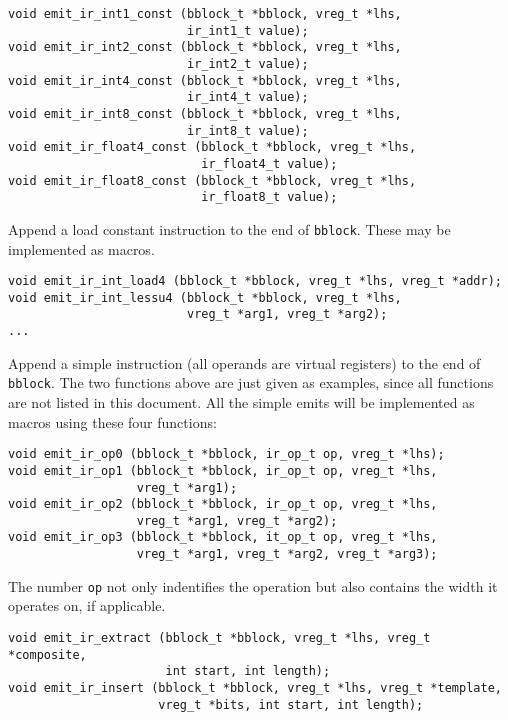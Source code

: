 \documentclass{article}
\newcommand{\cc}[1]{\texttt{#1}} %
\begin{document}
\begin{verbatim}
void emit_ir_int1_const (bblock_t *bblock, vreg_t *lhs,
                         ir_int1_t value);
void emit_ir_int2_const (bblock_t *bblock, vreg_t *lhs,
                         ir_int2_t value);
void emit_ir_int4_const (bblock_t *bblock, vreg_t *lhs,
                         ir_int4_t value);
void emit_ir_int8_const (bblock_t *bblock, vreg_t *lhs,
                         ir_int8_t value);
void emit_ir_float4_const (bblock_t *bblock, vreg_t *lhs,
                           ir_float4_t value);
void emit_ir_float8_const (bblock_t *bblock, vreg_t *lhs,
                           ir_float8_t value);
\end{verbatim}

Append a load constant instruction to the end of \cc{bblock}.  These
may be implemented as macros.

\begin{verbatim}
void emit_ir_int_load4 (bblock_t *bblock, vreg_t *lhs, vreg_t *addr);
void emit_ir_int_lessu4 (bblock_t *bblock, vreg_t *lhs,
                         vreg_t *arg1, vreg_t *arg2);
...
\end{verbatim}

Append a simple instruction (all operands are virtual registers) to
the end of \cc{bblock}.  The two functions above are just given as
examples, since all functions are not listed in this document.  All
the simple emits will be implemented as macros using these four
functions:

\begin{verbatim}
void emit_ir_op0 (bblock_t *bblock, ir_op_t op, vreg_t *lhs);
void emit_ir_op1 (bblock_t *bblock, ir_op_t op, vreg_t *lhs,
                  vreg_t *arg1);
void emit_ir_op2 (bblock_t *bblock, ir_op_t op, vreg_t *lhs,
                  vreg_t *arg1, vreg_t *arg2);
void emit_ir_op3 (bblock_t *bblock, it_op_t op, vreg_t *lhs,
                  vreg_t *arg1, vreg_t *arg2, vreg_t *arg3);
\end{verbatim}

The number \cc{op} not only indentifies the operation but also
contains the width it operates on, if applicable.

\begin{verbatim}
void emit_ir_extract (bblock_t *bblock, vreg_t *lhs, vreg_t *composite,
                      int start, int length);
void emit_ir_insert (bblock_t *bblock, vreg_t *lhs, vreg_t *template,
                     vreg_t *bits, int start, int length);
\end{verbatim}
\end{document}
